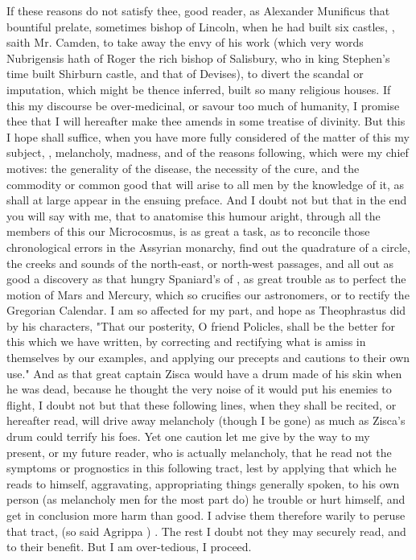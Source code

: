If these reasons do not satisfy thee, good reader, as Alexander Munificus that
bountiful prelate, sometimes bishop of Lincoln, when he had built six castles,
, saith Mr. Camden, to take
away the envy of his work (which very words Nubrigensis hath of Roger the rich
bishop of Salisbury, who in king Stephen's time built Shirburn castle, and that
of Devises), to divert the scandal or imputation, which might be thence
inferred, built so many religious houses. If this my discourse be
over-medicinal, or savour too much of humanity, I promise thee that I will
hereafter make thee amends in some treatise of divinity. But this I hope shall
suffice, when you have more fully considered of the matter of this my subject,
, melancholy, madness, and of the reasons following, which
were my chief motives: the generality of the disease, the necessity of the
cure, and the commodity or common good that will arise to all men by the
knowledge of it, as shall at large appear in the ensuing preface. And I doubt
not but that in the end you will say with me, that to anatomise this humour
aright, through all the members of this our Microcosmus, is as great a task, as
to reconcile those chronological errors in the Assyrian monarchy, find out the
quadrature of a circle, the creeks and sounds of the north-east, or north-west
passages, and all out as good a discovery as that hungry
Spaniard's of , as great trouble as to perfect the motion of Mars and
Mercury, which so crucifies our astronomers, or to rectify the Gregorian
Calendar. I am so affected for my part, and hope as
Theophrastus did by his characters, "That our posterity, O
friend Policles, shall be the better for this which we have written, by
correcting and rectifying what is amiss in themselves by our examples, and
applying our precepts and cautions to their own use." And as that great captain
Zisca would have a drum made of his skin when he was dead, because he thought
the very noise of it would put his enemies to flight, I doubt not but that
these following lines, when they shall be recited, or hereafter read, will
drive away melancholy (though I be gone) as much as Zisca's drum could terrify
his foes. Yet one caution let me give by the way to my present, or my future
reader, who is actually melancholy, that he read not the
symptoms or prognostics in this following tract, lest by
applying that which he reads to himself, aggravating, appropriating things
generally spoken, to his own person (as melancholy men for the most part do) he
trouble or hurt himself, and get in conclusion more harm than good. I advise
them therefore warily to peruse that tract,  (so said
Agrippa ) . The rest I doubt not they may
securely read, and to their benefit. But I am over-tedious, I proceed.

